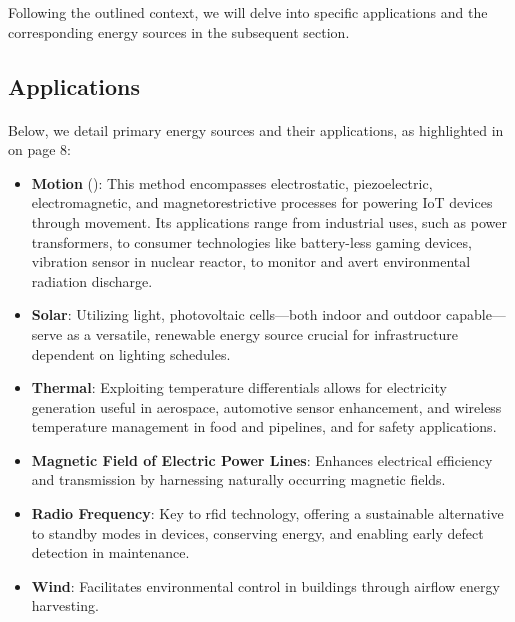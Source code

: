 Following the outlined context, we will delve into specific applications and the corresponding energy sources in the subsequent section.

\newpage
\subsection{Applications}

    \paragraph{}
    Below, we detail primary energy sources and their applications, as highlighted in \cite{greenIT} on page 8:
    \begin{itemize}
        \item \textbf{Motion} (\cite{eh_TorsionallyOscillatingMagnet}): This method encompasses \gls{electrostatic}, \gls{piezoelectric}, \gls{electromagnetic}, and \gls{magnetorestrictive} processes for powering IoT devices through movement. Its applications range from industrial uses, such as power transformers, to consumer technologies like battery-less gaming devices\cite{gameboyBatteryless}, vibration sensor in nuclear reactor\cite{iotSustainableEnergySystems}, to monitor and avert environmental radiation discharge.
        \item \textbf{Solar}: Utilizing light, \gls{photovoltaic} cells—both indoor and outdoor capable—serve as a versatile, renewable energy source crucial for infrastructure dependent on lighting schedules.
        \item \textbf{Thermal}: Exploiting temperature differentials allows for electricity generation useful in aerospace, automotive sensor enhancement, and wireless temperature management in food and pipelines, and for safety applications\cite{iotSustainableEnergySystems}.
        \item \textbf{Magnetic Field of Electric Power Lines}: Enhances electrical efficiency and transmission by harnessing naturally occurring magnetic fields.
        \item \textbf{Radio Frequency}: Key to \gls{rfid} technology, offering a sustainable alternative to standby modes in devices, conserving energy, and enabling early defect detection in maintenance.
        \item \textbf{Wind}: Facilitates environmental control in buildings through airflow energy harvesting.
    \end{itemize}

